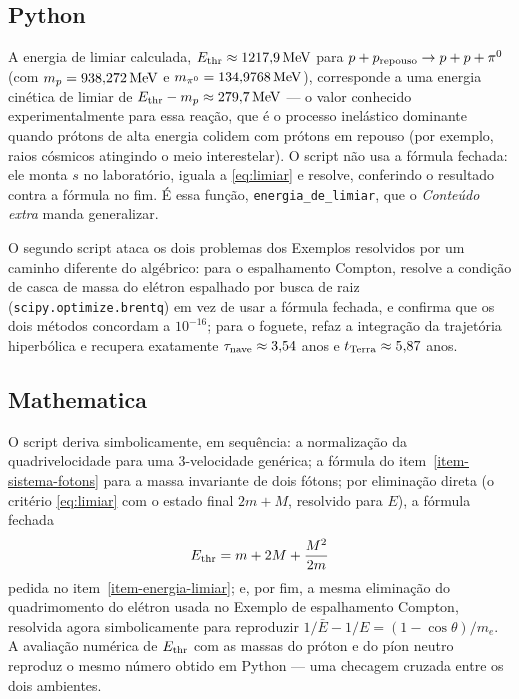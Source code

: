 \documentclass[12pt,a4paper,oneside]{book}
\theoremstyle{rgplain}
\theoremstyle{rgremark}
\begin{document}
\subsection{Python}


A energia de limiar calculada,
$E_{\rm thr}\approx1217{,}9\,{\rm MeV}$ para $p+p_{\rm repouso}\to p+p+\pi^0$
(com $m_p=938{,}272\,{\rm MeV}$ e $m_{\pi^0}=134{,}9768\,{\rm MeV}$),
corresponde a uma energia cinética de limiar de
$E_{\rm thr}-m_p\approx279{,}7\,{\rm MeV}$ --- o valor conhecido
experimentalmente para essa reação, que é o processo inelástico dominante
quando prótons de alta energia colidem com prótons em repouso (por exemplo,
raios cósmicos atingindo o meio interestelar). O script não usa a fórmula
fechada: ele monta $s$ no laboratório, iguala a \eqref{eq:limiar} e resolve,
conferindo o resultado contra a fórmula no fim. É essa função,
\texttt{energia\_de\_limiar}, que o \emph{Conteúdo extra} manda generalizar.

O segundo script ataca os dois problemas dos Exemplos resolvidos por um
caminho diferente do algébrico: para o espalhamento Compton, resolve a
condição de casca de massa do elétron espalhado por busca de raiz
(\texttt{scipy.optimize.brentq}) em vez de usar a fórmula fechada, e
confirma que os dois métodos concordam a $10^{-16}$; para o foguete, refaz a
integração da trajetória hiperbólica e recupera exatamente
$\tau_{\rm nave}\approx3{,}54$ anos e $t_{\rm Terra}\approx5{,}87$ anos.


\subsection{Mathematica}


O script deriva simbolicamente, em sequência: a normalização da
quadrivelocidade para uma 3-velocidade genérica; a fórmula do
item~\ref{item-sistema-fotons} para a massa invariante de dois fótons; por
eliminação direta (o critério \eqref{eq:limiar} com o estado final $2m+M$,
resolvido para $E$), a fórmula fechada
\[
  E_{\rm thr}=m+2M+\frac{M^2}{2m}
\]
pedida no item~\ref{item-energia-limiar}; e, por fim, a mesma eliminação do
quadrimomento do elétron usada no Exemplo de espalhamento Compton, resolvida
agora simbolicamente para reproduzir
$1/\bar E-1/E=(1-\cos\theta)/m_e$. A avaliação numérica de $E_{\rm thr}$ com as
massas do próton e do píon neutro reproduz o mesmo número obtido em Python
--- uma checagem cruzada entre os dois ambientes.
\end{document}
